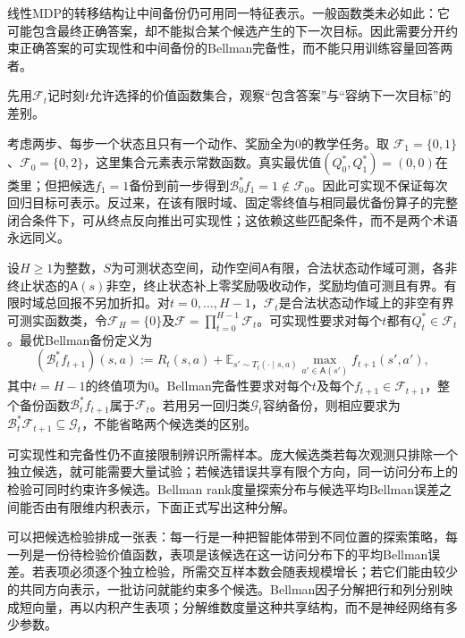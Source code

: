 线性MDP的转移结构让中间备份仍可用同一特征表示。一般函数类未必如此：它可能包含最终正确答案，却不能拟合某个候选产生的下一次目标。因此需要分开约束正确答案的可实现性和中间备份的Bellman完备性，而不能只用训练容量回答两者。

先用$\mathcal F_t$记时刻$t$允许选择的价值函数集合，观察“包含答案”与“容纳下一次目标”的差别。

考虑两步、每步一个状态且只有一个动作、奖励全为0的教学任务。取
$\mathcal F_1=\{0,1\}$、$\mathcal F_0=\{0,2\}$，这里集合元素表示常数函数。真实最优值$(Q_0^*,Q_1^*)=(0,0)$在类里；但把候选$f_1=1$备份到前一步得到$\mathcal B_0^*f_1=1\notin\mathcal F_0$。因此可实现不保证每次回归目标可表示。反过来，在该有限时域、固定零终值与相同最优备份算子的完整闭合条件下，可从终点反向推出可实现性；这依赖这些匹配条件，而不是两个术语永远同义。

\begin{definition}[可实现性与Bellman完备性]
  \label{def:rl-learning-realizability}
  设$H\geq1$为整数，$S$为可测状态空间，动作空间$\mathsf A$有限，合法状态动作域可测，各非终止状态的$\mathsf A(s)$非空，终止状态补上零奖励吸收动作，奖励均值可测且有界。有限时域总回报不另加折扣。对$t=0,\ldots,H-1$，$\mathcal F_t$是合法状态动作域上的非空有界可测实函数类，令$\mathcal F_H=\{0\}$及$\mathcal F=\prod_{t=0}^{H-1}\mathcal F_t$。可实现性要求对每个$t$都有$Q_t^*\in\mathcal F_t$。最优Bellman备份定义为
  \[
    (\mathcal B_t^* f_{t+1})(s,a)
       :=R_t(s,a)+\mathbb E_{s'\sim T_t(\cdot\mid s,a)}
                   \max_{a'\in\mathsf A(s')}f_{t+1}(s',a'),
  \]
  其中$t=H-1$的终值项为0。Bellman完备性要求对每个$t$及每个$f_{t+1}\in\mathcal F_{t+1}$，整个备份函数$\mathcal B_t^*f_{t+1}$属于$\mathcal F_t$。若用另一回归类$\mathcal G_t$容纳备份，则相应要求为$\mathcal B_t^*\mathcal F_{t+1}\subseteq\mathcal G_t$，不能省略两个候选类的区别。
\end{definition}

可实现性和完备性仍不直接限制辨识所需样本。庞大候选类若每次观测只排除一个独立候选，就可能需要大量试验；若候选错误共享有限个方向，同一访问分布上的检验可同时约束许多候选。Bellman rank度量探索分布与候选平均Bellman误差之间能否由有限维内积表示，下面正式写出这种分解。

可以把候选检验排成一张表：每一行是一种把智能体带到不同位置的探索策略，每一列是一份待检验价值函数，表项是该候选在这一访问分布下的平均Bellman误差。若表项必须逐个独立检验，所需交互样本数会随表规模增长；若它们能由较少的共同方向表示，一批访问就能约束多个候选。Bellman因子分解把行和列分别映成短向量，再以内积产生表项；分解维数度量这种共享结构，而不是神经网络有多少参数。

